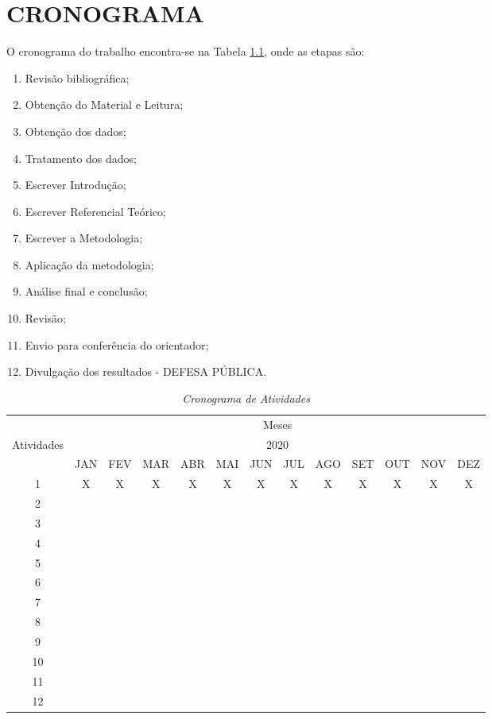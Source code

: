 \chapter{CRONOGRAMA}
	
O cronograma do trabalho encontra-se na Tabela \ref{tab:table1}, onde as etapas são:

\begin{enumerate}
	\item Revisão bibliográfica;
	\item Obtenção do Material e Leitura;
	\item Obtenção dos dados;
	\item Tratamento dos dados;
	\item Escrever Introdução;
	\item Escrever Referencial Teórico;
	\item Escrever a Metodologia;
	\item Aplicação da metodologia;
	\item Análise final e conclusão;
	\item Revisão;
	\item Envio para conferência do orientador;
	\item Divulgação dos resultados - DEFESA PÚBLICA.
\end{enumerate}

\begin{table}[!htb]
	\centering
	\begin{tabular}{|c|c|c|c|c|c|c|c|c|c|c|c|c|}
		\hline
		& \multicolumn{12}{|c|}{Meses} \\
		\cline{2-13} Atividades	& \multicolumn{12}{|c|}{2020} \\
		\cline{2-13} & JAN & FEV & MAR & ABR & MAI & JUN & JUL & AGO & SET & OUT & NOV & DEZ \\
		\hline 1 & X & X & X & X & X & X & X & X & X & X & X & X \\
		\hline 2 & & &  &  & & & & & & & & \\
		\hline 3 & & &  &  & & & & & & & & \\
		\hline 4 & & &  &  & & & & & & & & \\
		\hline 5 & & &  &  & & & & & & & & \\
		\hline 6 & & &  &  & & & & & & & & \\
		\hline 7 & & &  &  & & & & & & & & \\
		\hline 8 & & &  &  & & & & & & & & \\
		\hline 9 & & &  &  & & & & & & & & \\
		\hline 10 & & &  &  & & & & & & & & \\
		\hline 11 & & &  &  & & & & & & & & \\
		\hline 12 & & &  &  & & & & & & & & \\
		\hline
	\end{tabular} \caption{\emph{Cronograma de Atividades}}
	\label{tab:table1}
\end{table}
